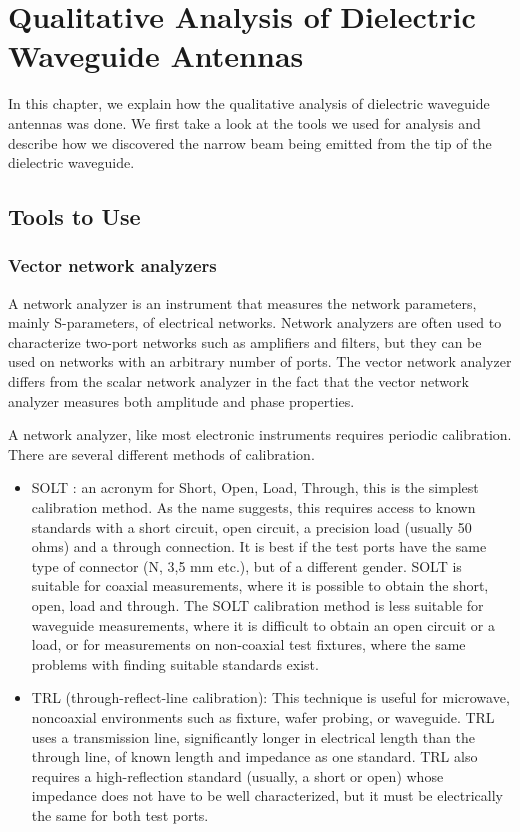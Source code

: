 \documentclass[a4paper,12pt]{report}
\begin{document}
\chapter{Qualitative Analysis of Dielectric Waveguide Antennas}

In this chapter,
we explain how the qualitative analysis of
dielectric waveguide antennas was done.
We first take a look at the tools we used for analysis and
describe how we discovered
the narrow beam being emitted from the tip of the dielectric waveguide.

\section{Tools to Use}

\subsection{Vector network analyzers}

A network analyzer is an instrument that measures the
network parameters, mainly S-parameters, of electrical networks.
Network analyzers are often used to characterize two-port networks
such as amplifiers and filters,
but they can be used on networks with an arbitrary number of ports.
The vector network analyzer differs from the scalar network analyzer
in the fact that the
vector network analyzer measures both amplitude and phase properties.

A network analyzer, like most electronic instruments requires periodic calibration.
There are several different methods of calibration.

\begin{itemize}
  \item SOLT : an acronym for Short, Open, Load, Through,
  this is the simplest calibration method. As the name suggests,
  this requires access to known standards with a short circuit, open circuit,
  a precision load (usually 50 ohms) and a through connection.
  It is best if the test ports have the same type of connector (N, 3,5 mm etc.),
  but of a different gender.
  SOLT is suitable for coaxial measurements,
  where it is possible to obtain the short, open, load and through.
  The SOLT calibration method is less suitable for waveguide measurements,
  where it is difficult to obtain an open circuit or a load,
  or for measurements on non-coaxial test fixtures,
  where the same problems with finding suitable standards exist.
  \item TRL (through-reflect-line calibration):
  This technique is useful for microwave, noncoaxial environments such as fixture,
  wafer probing, or waveguide.
  TRL uses a transmission line,
  significantly longer in electrical length than the through line,
  of known length and impedance as one standard.
  TRL also requires a high-reflection standard (usually, a short or open)
  whose impedance does not have to be well characterized,
  but it must be electrically the same for both test ports.
\end{itemize}
\end{document}

